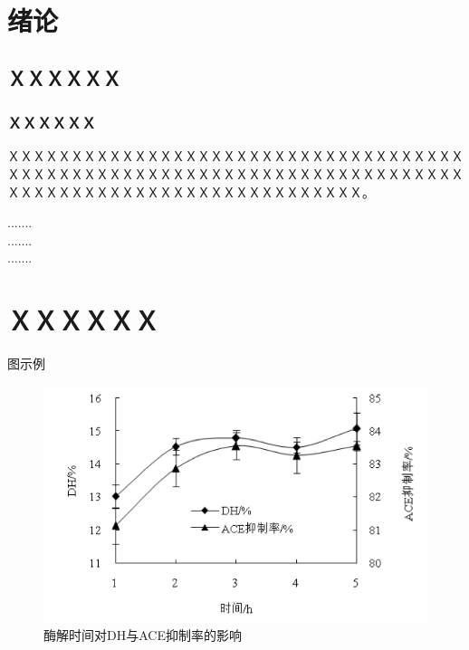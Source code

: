 \documentclass[a4paper]{ltxdoc}
\begin{document}
{
\setlength{\cftfignumwidth}{3.5em}
\setlength{\cfttabnumwidth}{3.5em}
\clearpage
\tableofcontents

\clearpage
\listoffigures

\clearpage
\listoftables

\setcounter{page}{0}
}

\fancyhead{}
\pagestyle{fancy}

{
\pretocmd{\section}{\clearpage \vspace*{-2.0em}}{}{}

\setlength{\parindent}{2em}
\setlength{\parskip}{0.5em}
\setlength{\baselineskip}{22pt}

\section{绪论}
\subsection{ＸＸＸＸＸＸ}
\subsubsection{ＸＸＸＸＸＸ}
ＸＸＸＸＸＸＸＸＸＸＸＸＸＸＸＸＸＸＸＸＸＸＸＸＸＸＸＸＸＸＸＸＸＸＸＸＸＸＸＸＸＸＸＸＸＸＸＸＸＸＸＸＸＸＸＸＸＸＸＸＸＸＸＸＸＸＸＸＸＸＸＸＸＸＸＸＸＸＸＸＸＸＸＸＸＸＸＸＸＸＸＸＸＸＸＸＸＸＸＸ。

\begin{center}
	.......\\
	.......\\
	.......
\end{center}

\section{ＸＸＸＸＸＸ}
图示例
\begin{figure}[!htb]
	\centering
	\includegraphics{images/example_figure1.png}
	\caption{酶解时间对DH与ACE抑制率的影响}
\end{figure}

}
\end{document}
